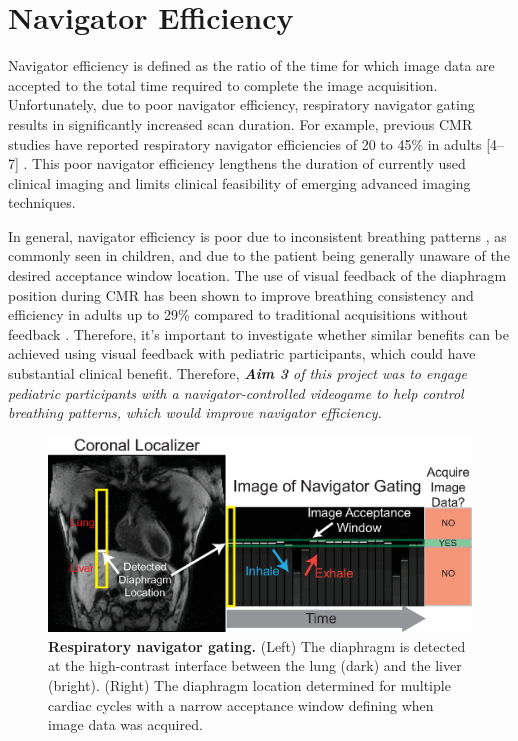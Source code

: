 \section{Navigator Efficiency}
	Navigator efficiency is defined as the ratio of the time for which image data are accepted to the total time required to complete the image acquisition. Unfortunately, due to poor navigator efficiency, respiratory navigator gating results in significantly increased scan duration. For example, previous CMR studies have reported respiratory navigator efficiencies of 20 to 45\% in adults [4–7] \cite{Abd-Elmoniem2011,Feuerlein2009,Jhooti2011,Wang1996}. This poor navigator efficiency lengthens the duration of currently used clinical imaging and limits clinical feasibility of emerging advanced imaging techniques.
	
	In general, navigator efficiency is poor due to inconsistent breathing patterns \cite{Liu1993,Wang1995a,Taylor1997a}, as commonly seen in children, and due to the patient being generally unaware of the desired acceptance window location. The use of visual feedback of the diaphragm position during CMR has been shown to improve breathing consistency and efficiency in adults up to 29\% compared to traditional acquisitions without feedback \cite{Feuerlein2009,Jhooti2011}. Therefore, it's important to investigate whether similar benefits can be achieved using visual feedback with pediatric participants, which could have substantial clinical benefit. Therefore, \textit{\textbf{Aim 3} of this project was to engage pediatric participants with a navigator-controlled videogame to help control breathing patterns, which would improve navigator efficiency.}
	
	\begin{figure}
		\centering
		\includegraphics{figures/intro/navigator_gating_explanation}
		\caption[Respiratory navigator gating]{\textbf{Respiratory navigator gating.} (Left) The diaphragm is detected at the high-contrast interface between the lung (dark) and the liver (bright). (Right) The diaphragm location determined for multiple cardiac cycles with a narrow acceptance window	defining when image data was acquired.}
		\label{fig:navigator_gating_explanation}
	\end{figure}

